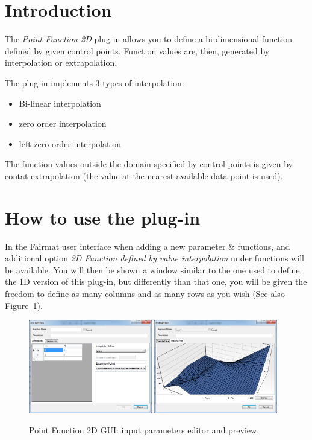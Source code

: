 \newcommand{\pluginName}{Point Function 2D}
\newcommand{\pluginVersion}{1.0.0}



\section{Introduction}
The \emph{Point Function 2D} plug-in allows you to define a bi-dimensional function defined by given control points. Function values are, then, generated by interpolation or extrapolation.

The plug-in implements 3 types of interpolation:
\begin{itemize}
\item Bi-linear interpolation
\item zero order interpolation
\item left zero order interpolation
\end{itemize}

The function values outside the domain specified by control points is given by contat extrapolation (the value at the nearest available data point is used).

\section{How to use the plug-in}
In the Fairmat user interface when adding a new parameter \& functions, and additional option \emph{2D Function defined by value interpolation} under functions will be available.
You will then be shown a window similar to the one used to define the 1D version of this plug-in, but differently than that one, you will be given the freedom to define as many columns and as many rows as you wish (See also Figure~\ref{fig.PFunction2DGUI}).

\begin{figure}[h]
\begin{center}
\includegraphics[width=0.48\textwidth]{./images/PFunction2DEdit.png}
\includegraphics[width=0.48\textwidth]{./images/PFunction2DPreview.png}
\caption{Point Function 2D GUI: input parameters editor and preview.}
\label{fig.PFunction2DGUI}
\end{center}
\end{figure}

